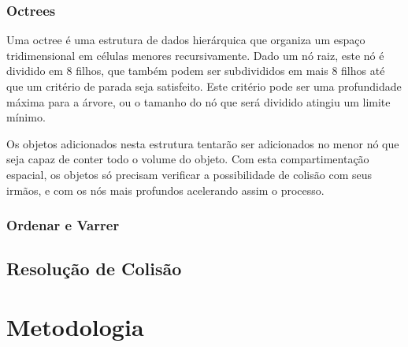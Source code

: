 \subsubsection{Octrees}

Uma octree é uma estrutura de dados hierárquica que organiza um espaço
tridimensional em células menores recursivamente.
Dado um nó raiz, este nó é dividido em 8  filhos, que também podem ser
subdivididos em mais 8 filhos até que um critério de parada seja satisfeito.
Este critério pode ser uma profundidade máxima para a árvore, ou o tamanho do
nó que será dividido atingiu um limite mínimo.

Os objetos adicionados nesta estrutura tentarão ser adicionados no menor nó que
seja capaz de conter todo o volume do objeto. Com esta compartimentação
espacial, os objetos só precisam verificar a possibilidade de colisão com seus
irmãos, e com os nós mais profundos acelerando assim o processo.


\subsubsection{Ordenar e Varrer}


\subsection{Resolução de Colisão}




\section{Metodologia}


